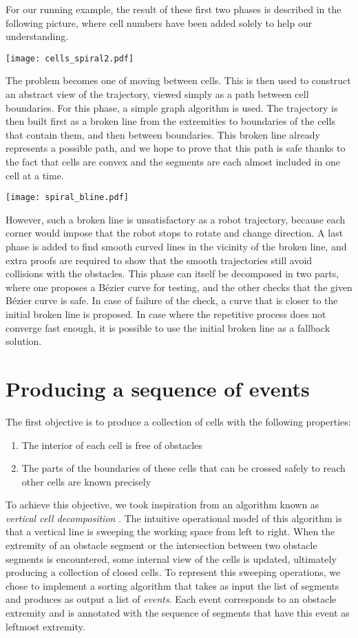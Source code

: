 \documentclass{easychair}
\begin{document}
For our running example, the result of these first two phases is
described in the following picture, where cell numbers have been added
solely to help our understanding.
\begin{center}
\texttt{[image: cells\_spiral2.pdf]}
\end{center}
The problem becomes one of moving between cells. This is then used to
construct an abstract view of the trajectory, viewed simply as a path
between cell boundaries.  For this phase, a simple graph algorithm is
used.  The trajectory is then built first as a broken line from the
extremities to boundaries of the cells that contain them, and then
between boundaries.  This broken line already represents a possible
path, and we hope to prove that this path is safe thanks to the fact
that cells are convex and the segments are each almost included in one
cell at a time.
\begin{center}
\texttt{[image: spiral\_bline.pdf]}
\end{center}
However, such a broken line is unsatisfactory
as a robot trajectory, because each corner would impose that the robot
stops to rotate and change direction.  A last phase is added to find
smooth curved lines in the vicinity of the broken line, and extra proofs are
required to show that the smooth trajectories still avoid collisions with
the obstacles.  This phase can itself be decomposed in two parts, where one
proposes a Bézier curve for testing, and the other checks that the given
Bézier curve is safe.  In case of failure of the check, a curve that is closer
to the initial broken line is proposed.  In case where the repetitive process
does not converge fast enough, it is possible to use the initial broken line as
a fallback solution.

\section{Producing a sequence of events}
The first objective is to produce a collection of cells with the following
properties:
\begin{enumerate}
\item The interior of each cell is free of obstacles
\item The parts of the boundaries of these cells that can be crossed
  safely to reach other cells are known precisely
\end{enumerate}
To achieve this objective, we took inspiration from an algorithm known as
{\em vertical cell decomposition} \cite{Latombe91}.  The intuitive
operational model of this algorithm is that a vertical line is
sweeping the working space from left to right.  When the extremity of
an obstacle segment or the intersection between two obstacle segments
is encountered, some internal view of the cells is updated, ultimately
producing a collection of closed cells.  To represent this sweeping
operations, we chose to implement a sorting algorithm that takes as
input the list of segments and produces as output a list of {\em
  events}.  Each event corresponds to an obstacle extremity and is
annotated with the sequence of segments that have this event as
leftmost extremity.
\end{document}
